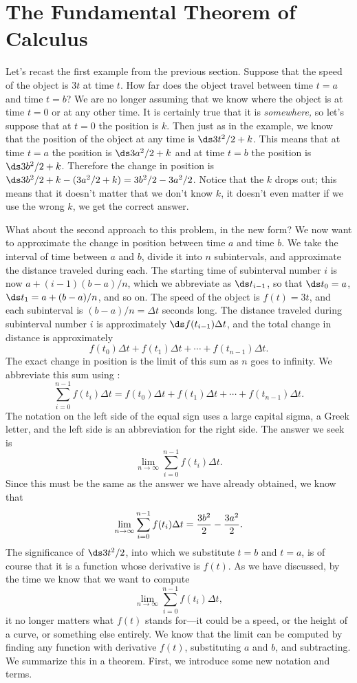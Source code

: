 \section{The Fundamental Theorem of Calculus}\label{sec:FTC}
Let's recast the first example from the previous section. Suppose that
the speed of the object is $3t$ at time $t$. How far does the object
travel between time $t=a$ and time $t=b$? We are no longer assuming
that we know where the object is at time $t=0$ or at any other
time. It is certainly true that it is {\it somewhere,} so let's
suppose that at $t=0$ the position is $k$. Then just as in the
example, we know that the position of the object at any time is 
$\ds 3t^2/2+k$. This means that at time $t=a$ the position is 
$\ds 3a^2/2+k$ and at time $t=b$ the position is $\ds 3b^2/2+k$. Therefore the
change in position is $\ds 3b^2/2+k-(3a^2/2+k)=3b^2/2-3a^2/2$. Notice that
the $k$ drops out; this means that it doesn't matter that we don't
know $k$, it doesn't even matter if we use the wrong $k$, we get the
correct answer. 

What about the second approach to this problem, in the new form? We
now want to approximate the change in position between time $a$ and
time $b$. We take the interval of time between $a$ and $b$, divide it
into $n$ subintervals, and approximate the distance traveled during
each. The starting time of subinterval number $i$ is now 
$a+(i-1)(b-a)/n$, which we abbreviate as $\ds t_{i-1}$, so that 
$\ds t_0=a$, $\ds t_1=a+(b-a)/n$, and so on. The speed of the object is
$f(t)=3t$, and each subinterval is $(b-a)/n=\Delta t$ seconds long.
The distance traveled during subinterval number
$i$ is approximately $\ds f(t_{i-1})\Delta t$, and the total change in
distance is approximately
$$
  f(t_0)\Delta t+f(t_1)\Delta t+\cdots+f(t_{n-1})\Delta t.
$$
The exact change in position is the limit of this sum as $n$ goes to
infinity. We abbreviate this sum using :
$$
  \sum_{i=0}^{n-1} f(t_i)\Delta t =
f(t_0)\Delta t+f(t_1)\Delta t+\cdots+f(t_{n-1})\Delta t.
$$
The notation on the left side of the equal sign uses a large capital
sigma, a Greek letter, and the left side is an abbreviation for the
right side. The answer we seek is
$$
  \lim_{n\to\infty}\sum_{i=0}^{n-1} f(t_i)\Delta t.
$$ 
Since this must be the same as the answer we have already obtained, we
know that 
$$
  \lim_{n\to\infty}\sum_{i=0}^{n-1} f(t_i)\Delta t={3b^2\over
  2}-{3a^2\over 2}.
$$
The significance of $\ds 3t^2/2$, into which we substitute $t=b$ and
$t=a$, is of course that it is a function whose derivative is $f(t)$.
As we have discussed, by the time we know that we want to compute
$$
  \lim_{n\to\infty}\sum_{i=0}^{n-1} f(t_i)\Delta t,
$$
it no longer matters what $f(t)$ stands for---it could be a speed, or
the height of a curve, or something else entirely. We know that
the limit can be computed by finding any function with derivative
$f(t)$, substituting $a$ and $b$, and subtracting. We summarize this
in a theorem. First, we introduce some new notation and terms.

